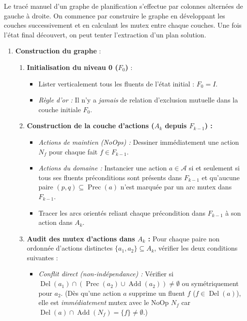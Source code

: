 \begin{proposition}
    Le tracé manuel d'un graphe de planification s'effectue par colonnes alternées de gauche à droite. On commence par construire le graphe en développant les couches successivement et en calculant les mutex entre chaque couches. Une fois l'état final découvert, on peut tenter l'extraction d'un plan solution. 
    
    \begin{enumerate}
        \item \textbf{Construction du graphe} : 
        \begin{enumerate}
            \item \textbf{Initialisation du niveau 0 ($F_0$)} :
            \begin{itemize}
                \item Lister verticalement tous les fluents de l'état initial : $F_0 = I$.
                \item \emph{Règle d'or :} Il n'y a \emph{jamais} de relation d'exclusion mutuelle dans la couche initiale $F_0$.
            \end{itemize}

            \item \textbf{Construction de la couche d'actions ($A_k$ depuis $F_{k-1}$) :}
            \begin{itemize}
                \item \emph{Actions de maintien (NoOps) :} Dessiner immédiatement une action $N_f$ pour chaque fait $f \in F_{k-1}$.
                \item \emph{Actions du domaine :} Instancier une action $a \in \mathcal{A}$ si et seulement si tous ses fluents préconditions sont présents dans $F_{k-1}$ et qu'aucune paire $(p, q) \subseteq \operatorname{Prec}(a)$ n'est marquée par un arc mutex dans $F_{k-1}$.
                \item Tracer les arcs orientés reliant chaque précondition dans $F_{k-1}$ à son action dans $A_k$.
            \end{itemize}

            \item \textbf{Audit des mutex d'actions dans $A_k$ :}
            Pour chaque paire non ordonnée d'actions distinctes $\{a_1, a_2\} \subseteq A_k$, vérifier les deux conditions suivantes :
            \begin{itemize}
                \item \emph{Conflit direct (non-indépendance) :} Vérifier si $\operatorname{Del}(a_1) \cap (\operatorname{Prec}(a_2) \cup \operatorname{Add}(a_2)) \neq \emptyset$ ou symétriquement pour $a_2$.
                (Dès qu'une action $a$ supprime un fluent $f$ ($f \in \operatorname{Del}(a)$), elle est \emph{immédiatement} mutex avec le NoOp $N_f$ car $\operatorname{Del}(a) \cap \operatorname{Add}(N_f) = \{f\} \neq \emptyset$.)


\end{itemize}
\end{enumerate}
\end{enumerate}
\end{proposition}
